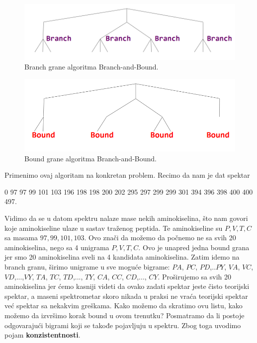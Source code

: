 \begin{minipage}{\textwidth}
	\centering
	\begin{minipage}{0.45\textwidth}
		\begin{figure}[H]
			\centering
			\includegraphics[width=\textwidth]{poglavlja/4/slike/branch.png}
			\caption{Branch grane algoritma Branch-and-Bound.}
			\label{slika:branch}
		\end{figure} 
	\end{minipage}
	\hfill 
	\begin{minipage}{0.45\textwidth}
		\begin{figure}[H]
			\centering
			\includegraphics[width=\textwidth]{poglavlja/4/slike/bound.png}
			\caption{Bound grane algoritma Branch-and-Bound.}
			\label{slika:bound}
		\end{figure} 
	\end{minipage}
	\vspace*{1em}
\end{minipage}

Primenimo ovaj algoritam na konkretan problem. Recimo da nam je dat spektar
\begin{center}
 0 97 97 99 101 103 196 198 198 200 202 295 297 299 299 301 394 396 398 400 400 497.
 \end{center} 
\noindent  Vidimo da se u datom spektru nalaze mase nekih aminokiselina, što nam govori koje aminokiseline ulaze u sastav traženog peptida. Te aminokiseline su $P,V,T,C$ sa masama $97,99, 101, 103$. Ovo znači da možemo da počnemo ne sa svih 20 aminokiselina, nego sa 4 unigrama $P,V,T,C$. Ovo je unapred jedna bound grana jer smo 20 aminokiselina sveli na 4 kandidata aminokiselina. Zatim idemo na branch granu, širimo unigrame u sve moguće bigrame: $PA$, $PC$, $PD$,..$PY$, $VA$, $VC$, $VD$,...,$VY$, $TA$, $TC$, $TD$,..., $TY$, $CA$, $CC$, $CD$,..., $CY$. Proširujemo sa svih 20 aminokiselina jer ćemo kasniji videti da ovako zadati spektar jeste čisto teorijski spektar, a maseni spektrometar skoro nikada u praksi ne vraća teorijski spektar već spektar sa nekakvim greškama. Kako možemo da skratimo ovu listu, kako možemo da izvršimo korak bound u ovom trenutku? Posmatramo da li postoje odgovarajući bigrami koji se takođe pojavljuju u spektru. Zbog toga uvodimo pojam \textbf{konzistentnosti}.

